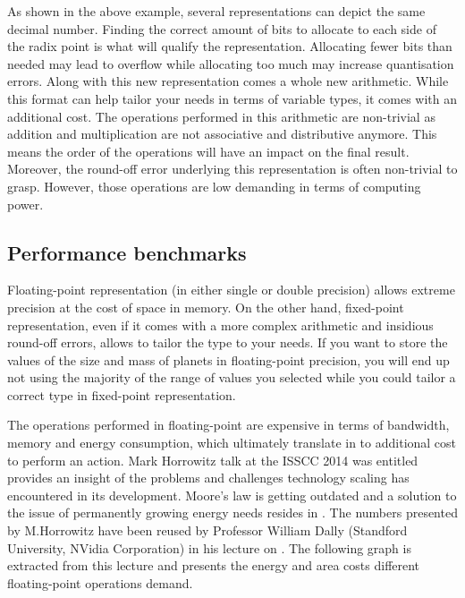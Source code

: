 As shown in the above example, several representations can depict the same decimal number. Finding the correct amount of bits to allocate to each side of the radix point is what will qualify the representation. Allocating fewer bits than needed may lead to overflow while allocating too much may increase quantisation errors.
Along with this new representation comes a whole new arithmetic. While this format can help tailor your needs in terms of variable types, it comes with an additional cost. The operations performed in this arithmetic are non-trivial as addition and multiplication are not associative and distributive anymore. This means the order of the operations will have an impact on the final result. Moreover, the round-off error underlying this representation is often non-trivial to grasp. However, those operations are low demanding in terms of computing power.

\subsection{Performance benchmarks}

Floating-point representation (in either single or double precision) allows extreme precision at the cost of space in memory. On the other hand, fixed-point representation, even if it comes with a more complex arithmetic and insidious round-off errors, allows to tailor the type to your needs. If you want to store the values of the size and mass of planets in floating-point precision, you will end up not using the majority of the range of values you selected while you could tailor a correct type in fixed-point representation.

The operations performed in floating-point are expensive in terms of bandwidth, memory and energy consumption, which ultimately translate in to additional cost to perform an action. Mark Horrowitz talk at the ISSCC 2014 was entitled  provides an insight of the problems and challenges technology scaling has encountered in its development. Moore's law is getting outdated and a solution to the issue of permanently growing energy needs resides in . The numbers presented by M.Horrowitz have been reused by Professor William Dally (Standford University, NVidia Corporation) in his lecture on  \cite{Nips2015}. The following graph is extracted from this lecture and presents the energy and area costs different floating-point operations demand.

